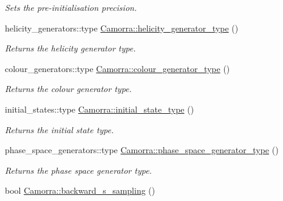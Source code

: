 \begin{DoxyCompactItemize}
\begin{DoxyCompactList}\small\item\em Sets the pre-\/initialisation precision. \end{DoxyCompactList}\item 
\hypertarget{a00800_a930109bdfb48e147a55e1b694cef846f}{
helicity\_\-generators::type \hyperlink{a00800_a930109bdfb48e147a55e1b694cef846f}{Camorra::helicity\_\-generator\_\-type} ()}
\label{a00800_a930109bdfb48e147a55e1b694cef846f}

\begin{DoxyCompactList}\small\item\em Returns the helicity generator type. \end{DoxyCompactList}\item 
\hypertarget{a00800_a7b12504bda851b5f9add6655ca64e29d}{
colour\_\-generators::type \hyperlink{a00800_a7b12504bda851b5f9add6655ca64e29d}{Camorra::colour\_\-generator\_\-type} ()}
\label{a00800_a7b12504bda851b5f9add6655ca64e29d}

\begin{DoxyCompactList}\small\item\em Returns the colour generator type. \end{DoxyCompactList}\item 
\hypertarget{a00800_ad604036da940bd8df34f20218cf90ae7}{
initial\_\-states::type \hyperlink{a00800_ad604036da940bd8df34f20218cf90ae7}{Camorra::initial\_\-state\_\-type} ()}
\label{a00800_ad604036da940bd8df34f20218cf90ae7}

\begin{DoxyCompactList}\small\item\em Returns the initial state type. \end{DoxyCompactList}\item 
\hypertarget{a00800_aa183252f5e018fdfdaf227b5885fb835}{
phase\_\-space\_\-generators::type \hyperlink{a00800_aa183252f5e018fdfdaf227b5885fb835}{Camorra::phase\_\-space\_\-generator\_\-type} ()}
\label{a00800_aa183252f5e018fdfdaf227b5885fb835}

\begin{DoxyCompactList}\small\item\em Returns the phase space generator type. \end{DoxyCompactList}\item 
\hypertarget{a00800_a10d06d9eeb886cc2282993cf798acd48}{
bool \hyperlink{a00800_a10d06d9eeb886cc2282993cf798acd48}{Camorra::backward\_\-s\_\-sampling} ()}
\label{a00800_a10d06d9eeb886cc2282993cf798acd48}


\end{DoxyCompactItemize}
